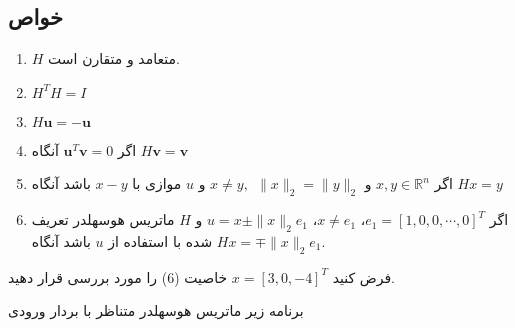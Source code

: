\subsection*{خواص}
\begin{enumerate}
	\item 
	$H$
	متعامد و متقارن است.
	\item 
	\(
	H^T H = I
	\)
	\item
	\(
	H \mathbf{u}= -\mathbf{u}
	\)
	\item 
	اگر 
	$\mathbf{u}^T\mathbf{v}=0$
	آنگاه 
	$H \mathbf{v}= \mathbf{v}$
	\item 
	اگر 
	$x, y\in \mathbb{R}^n$
	و 
	$x\neq y, ~~\|x\|_2=\|y\|_2$
	و 
	$u$
	موازی با 
	$x-y$
	باشد آنگاه
	$Hx=y$
	\item 
	اگر
	$e_1=[1, 0, 0, \cdots, 0]^T$،
	$x\neq e_1$،
	$u=x\pm\|x\|_2 e_1$
	و
	$H$
	ماتریس هوسهلدر تعریف شده با استفاده از 
	$u$
	باشد آنگاه
	$Hx=\mp\|x\|_2 e_1$.
\end{enumerate}
\begin{exercise}
	فرض کنید 
	$x=[3, 0, -4]^T$
	خاصیت (6) را مورد بررسی قرار دهید.
\end{exercise}
برنامه زیر ماتریس هوسهلدر متناظر با بردار ورودی 

